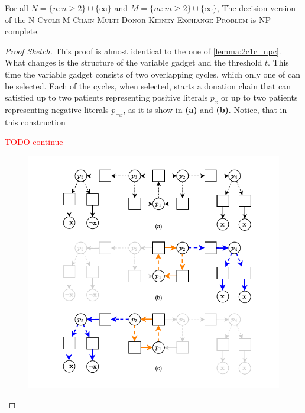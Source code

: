 \begin{lemma}
\label{lemma:2n1m_npc}
For all $N = \{n : n \ge 2\} \cup \{\infty\}$ and $M = \{m:m \ge 2\} \cup \{\infty\}$, The decision version of the \textsc{N-Cycle M-Chain Multi-Donor Kidney Exchange Problem} is NP-complete.

\begin{proof}[Proof Sketch]
This proof is almost identical to the one of \autoref{lemma:2c1c_npc}. What changes is the structure of the variable gadget and the threshold $t$. This time the variable gadget consists of two overlapping cycles, which only one of can be selected. Each of the cycles, when selected, starts a donation chain that can satisfied up to two patients representing positive literals $p_x$ or up to two patients representing negative literals $p_{\neg{x}}$, as it is show in \textbf{(a)} and \textbf{(b)}. Notice, that in this construction

\textcolor{red}{TODO continue}

\begin{figure}
    \centering
    \includegraphics{data/sat_reduction_boolean_gadget2.pdf}
    \caption[]{}
    \label{fig:sat_reduction_boolean_gadget2}
\end{figure}

\end{proof}
\end{lemma}



